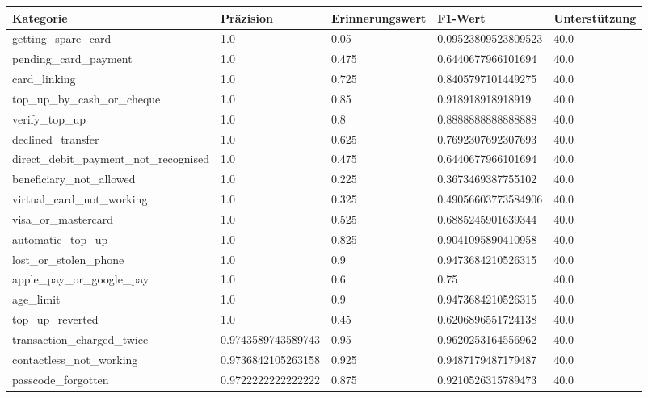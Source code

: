 
    \begin{table}[!ht]
        \centering
        \begin{tabularx}{\textwidth}{X l l l l}
\toprule
\textbf{Kategorie} & \textbf{Präzision} & \textbf{Erinnerungswert} & \textbf{F1-Wert} & \textbf{Unterstützung} \\
\midrule
getting\_spare\_card & \num{1.0} & \num{0.05} & \num{0.09523809523809523} & \num{40.0} \\
pending\_card\_payment & \num{1.0} & \num{0.475} & \num{0.6440677966101694} & \num{40.0} \\
card\_linking & \num{1.0} & \num{0.725} & \num{0.8405797101449275} & \num{40.0} \\
top\_up\_by\_cash\_or\_cheque & \num{1.0} & \num{0.85} & \num{0.918918918918919} & \num{40.0} \\
verify\_top\_up & \num{1.0} & \num{0.8} & \num{0.8888888888888888} & \num{40.0} \\
declined\_transfer & \num{1.0} & \num{0.625} & \num{0.7692307692307693} & \num{40.0} \\
direct\_debit\_payment\_not\_recognised & \num{1.0} & \num{0.475} & \num{0.6440677966101694} & \num{40.0} \\
beneficiary\_not\_allowed & \num{1.0} & \num{0.225} & \num{0.3673469387755102} & \num{40.0} \\
virtual\_card\_not\_working & \num{1.0} & \num{0.325} & \num{0.49056603773584906} & \num{40.0} \\
visa\_or\_mastercard & \num{1.0} & \num{0.525} & \num{0.6885245901639344} & \num{40.0} \\
automatic\_top\_up & \num{1.0} & \num{0.825} & \num{0.9041095890410958} & \num{40.0} \\
lost\_or\_stolen\_phone & \num{1.0} & \num{0.9} & \num{0.9473684210526315} & \num{40.0} \\
apple\_pay\_or\_google\_pay & \num{1.0} & \num{0.6} & \num{0.75} & \num{40.0} \\
age\_limit & \num{1.0} & \num{0.9} & \num{0.9473684210526315} & \num{40.0} \\
top\_up\_reverted & \num{1.0} & \num{0.45} & \num{0.6206896551724138} & \num{40.0} \\
transaction\_charged\_twice & \num{0.9743589743589743} & \num{0.95} & \num{0.9620253164556962} & \num{40.0} \\
contactless\_not\_working & \num{0.9736842105263158} & \num{0.925} & \num{0.9487179487179487} & \num{40.0} \\
passcode\_forgotten & \num{0.9722222222222222} & \num{0.875} & \num{0.9210526315789473} & \num{40.0} \\

\end{tabularx}
\end{table}

